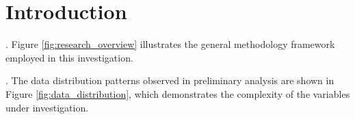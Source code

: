 \section{Introduction}

\lipsum[1-2]

\lipsum[3-4] \cite{author2023, another2022, reference2023}. Figure \ref{fig:research_overview} illustrates the general methodology framework employed in this investigation.



\lipsum[5-6] \cite{example2023, sample2022}. The data distribution patterns observed in preliminary analysis are shown in Figure \ref{fig:data_distribution}, which demonstrates the complexity of the variables under investigation.



\lipsum[7-9]

\lipsum[10-12]